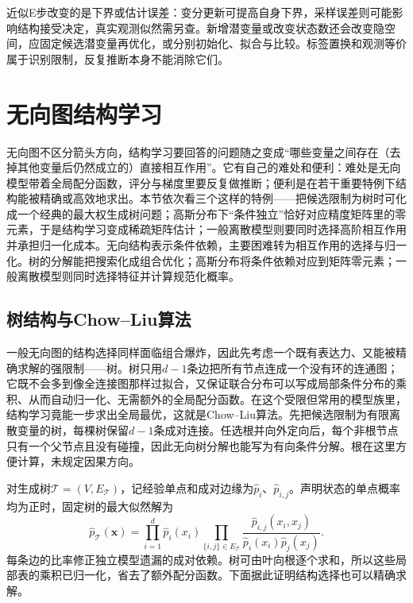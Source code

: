 近似E步改变的是下界或估计误差：变分更新可提高自身下界，采样误差则可能影响结构接受决定，真实观测似然需另查。新增潜变量或改变状态数还会改变隐空间，应固定候选潜变量再优化，或分别初始化、拟合与比较。标签置换和观测等价属于识别限制，反复推断本身不能消除它们。

\section{无向图结构学习}
\label{sec:pgm-structure-learning-undirected}

无向图不区分箭头方向，结构学习要回答的问题随之变成“哪些变量之间存在（去掉其他变量后仍然成立的）直接相互作用”。它有自己的难处和便利：难处是无向模型带着全局配分函数，评分与梯度里要反复做推断；便利是在若干重要特例下结构能被精确或高效地求出。本节依次看三个这样的特例——把候选限制为树时可化成一个经典的最大权生成树问题；高斯分布下“条件独立”恰好对应精度矩阵里的零元素，于是结构学习变成稀疏矩阵估计；一般离散模型则要同时选择高阶相互作用并承担归一化成本。无向结构表示条件依赖，主要困难转为相互作用的选择与归一化。树的分解能把搜索化成组合优化；高斯分布将条件依赖对应到矩阵零元素；一般离散模型则同时选择特征并计算规范化概率。

\subsection{树结构与Chow--Liu算法}
\label{sec:pgm-structure-learning-chow-liu}

一般无向图的结构选择同样面临组合爆炸，因此先考虑一个既有表达力、又能被精确求解的强限制——树。树只用$d-1$条边把所有节点连成一个没有环的连通图；它既不会多到像全连接图那样过拟合，又保证联合分布可以写成局部条件分布的乘积、从而自动归一化、无需额外的全局配分函数。在这个受限但常用的模型族里，结构学习竟能一步求出全局最优，这就是Chow--Liu算法。先把候选限制为有限离散变量的树，每棵树保留$d-1$条成对连接。任选根并向外定向后，每个非根节点只有一个父节点且没有碰撞，因此无向树分解也能写为有向条件分解。根在这里方便计算，未规定因果方向。

对生成树$\mathcal{T}=(V,E_{\mathcal{T}})$，记经验单点和成对边缘为$\widehat p_i$、$\widehat p_{i,j}$。声明状态的单点概率均为正时，固定树的最大似然解为
\begin{equation}
  \widehat p_{\mathcal{T}}(\bm{x})
  =\prod_{i=1}^{d}\widehat p_i(x_i)
   \prod_{\{i,j\}\in E_{\mathcal{T}}}
     \frac{\widehat p_{i,j}(x_i,x_j)}
          {\widehat p_i(x_i)\widehat p_j(x_j)}.
  \label{eq:pgm-structure-learning-tree-factor}
\end{equation}
每条边的比率修正独立模型遗漏的成对依赖。树可由叶向根逐个求和，所以这些局部表的乘积已归一化，省去了额外配分函数。下面据此证明结构选择也可以精确求解。

